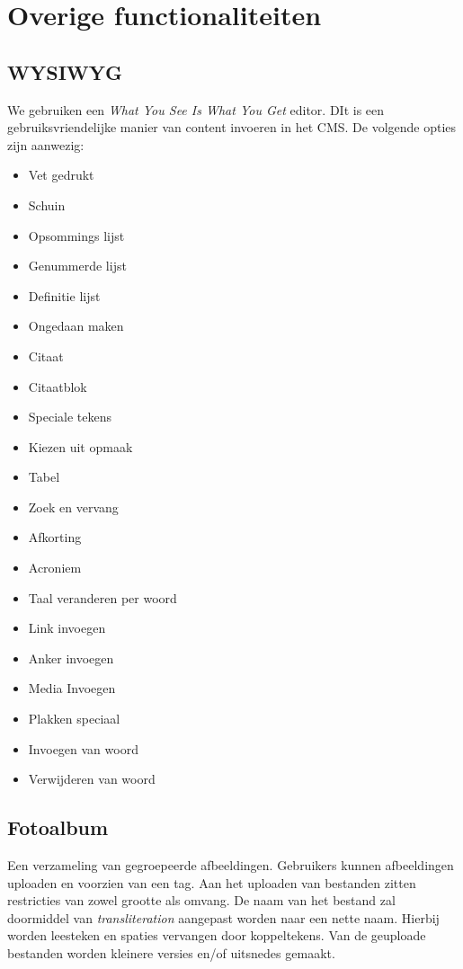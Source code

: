 
\section{Overige functionaliteiten}
\label{sec:overigefunctionaliteiten}

\subsection{WYSIWYG}
We gebruiken een \emph{What You See Is What You Get} editor. DIt is een gebruiksvriendelijke manier van content invoeren in het CMS. De volgende opties zijn aanwezig:

\begin{itemize}
  \item Vet gedrukt
  \item Schuin
  \item Opsommings lijst
  \item Genummerde lijst 
  \item Definitie lijst
  \item Ongedaan maken
  \item Citaat
  \item Citaatblok
  \item Speciale tekens
  \item Kiezen uit opmaak
  \item Tabel
  \item Zoek en vervang
  \item Afkorting
  \item Acroniem
  \item Taal veranderen per woord
  \item Link invoegen
  \item Anker invoegen
  \item Media Invoegen
  \item Plakken speciaal
  \item Invoegen van woord
  \item Verwijderen van woord
\end{itemize}

\subsection{Fotoalbum}
Een verzameling van gegroepeerde afbeeldingen. Gebruikers kunnen afbeeldingen uploaden en voorzien van een tag. Aan het uploaden van bestanden zitten restricties van zowel grootte als omvang. De naam van het bestand zal doormiddel van \emph{transliteration} aangepast worden naar een nette naam. Hierbij worden leesteken en spaties vervangen door koppeltekens. Van de geuploade bestanden worden kleinere versies en/of uitsnedes gemaakt.

